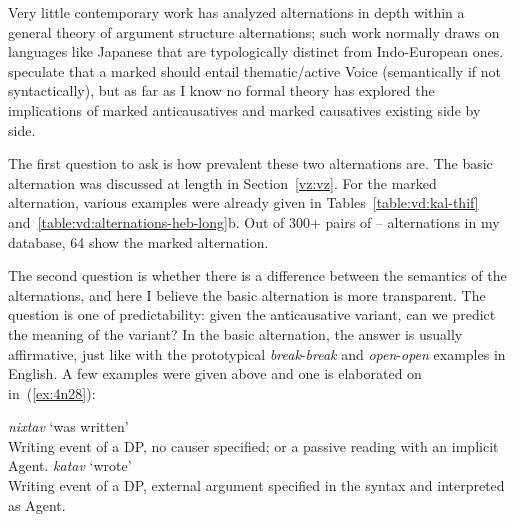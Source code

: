\begin{exe}
\begin{xlist}
\begin{xlist}
\begin{exe}
\begin{exe}
\begin{xlist}
\begin{exe}
\begin{xlist}
\begin{exe}
\begin{xlist}
\begin{xlist}
\begin{exe}
\begin{xlist}
\begin{exe}
\begin{xlist}
\begin{exe}
\begin{xlist}
\begin{exe}
\begin{exe}
\begin{exe}
\begin{xlist}
\begin{exe}
\begin{exe}
\begin{xlist}
\begin{xlist}
\begin{exe}
\begin{xlist}
\begin{exe}
\begin{exe}
\begin{xlist}
\begin{exe}
\begin{exe}
\begin{xlist}
\begin{exe}
\begin{xlist}
\begin{exe}
\begin{xlist}
\begin{exe}
\begin{xlist}
\begin{exe}
Very little contemporary work has analyzed  alternations in depth within a general theory of argument structure alternations; such work normally draws on languages like Japanese \citep{jacobsen92} that are typologically distinct from Indo-European ones. \citet[62fn]{layering15} speculate that a marked  should entail thematic/active Voice (semantically if not syntactically), but as far as I know no formal theory has explored the implications of marked anticausatives and marked causatives existing side by side.

The first question to ask is how prevalent these two alternations are. The basic alternation was discussed at length in Section~\ref{vz:vz}. For the marked alternation, various examples were already given in Tables~\ref{table:vd:kal-thif} and~\ref{table:vd:alternations-heb-long}b. Out of 300+ pairs of {\tkal}--{\thif} alternations in my database, 64 show the marked alternation.\largerpage[-1]

The second question is whether there is a difference between the semantics of the alternations, and here I believe the basic alternation is more transparent. The question is one of predictability: given the anticausative variant, can we predict the meaning of the  variant? In the basic alternation, the answer is usually affirmative, just like with the prototypical \emph{break}-\emph{break} and \emph{open}-\emph{open} examples in English. A few examples were given  above and one is elaborated on in~(\ref{ex:4n28}):
 \begin{exe}
 \ex  \label{ex:4n28}
 \begin{xlist} 
 	\ex  \emph{nixtav} `was written' \\
		Writing event of a DP, no causer specified; or a passive reading with an implicit Agent.
 	\ex  \emph{katav} `wrote' \\
		Writing event of a DP, external argument specified in the syntax and interpreted as Agent.
 \z
\z 


\end{xlist}
\end{exe}
\end{exe}
\end{xlist}
\end{exe}
\end{xlist}
\end{exe}
\end{xlist}
\end{exe}
\end{xlist}
\end{exe}
\end{exe}
\end{xlist}
\end{exe}
\end{exe}
\end{xlist}
\end{exe}
\end{xlist}
\end{xlist}
\end{exe}
\end{exe}
\end{xlist}
\end{exe}
\end{exe}
\end{exe}
\end{xlist}
\end{exe}
\end{xlist}
\end{exe}
\end{xlist}
\end{exe}
\end{xlist}
\end{xlist}
\end{exe}
\end{xlist}
\end{exe}
\end{xlist}
\end{exe}
\end{exe}
\end{xlist}
\end{xlist}
\end{exe}
